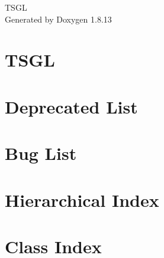 \documentclass[twoside]{book}
\newcommand{\+}{\discretionary{\mbox{\scriptsize$\hookleftarrow$}}{}{}}
\newcommand{\clearemptydoublepage}{%
  \newpage{\pagestyle{empty}\cleardoublepage}%
}
\begin{document}
\hypersetup{pageanchor=false,
             bookmarksnumbered=true,
             pdfencoding=unicode
            }
\begin{titlepage}
\vspace*{7cm}
\begin{center}%
{\Large T\+S\+GL }\\
\vspace*{1cm}
{\large Generated by Doxygen 1.8.13}\\
\end{center}
\end{titlepage}
\clearemptydoublepage
{}
\tableofcontents
\clearemptydoublepage
{}
\hypersetup{pageanchor=true}

\chapter{T\+S\+GL}
\label{md__home_rjv59__desktop__calvin_research__t_s_g_l_readme}

\chapter{Deprecated List}
\label{deprecated}

\chapter{Bug List}
\label{bug}

\chapter{Hierarchical Index}

\chapter{Class Index}

\end{document}
